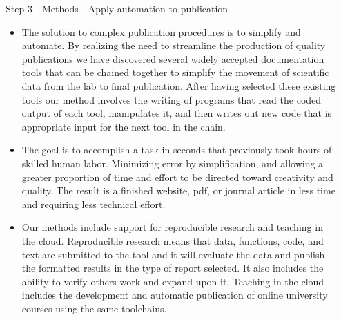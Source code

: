 \documentclass[final]{beamer}
\begin{document}
\begin{frame}[fragile]
\begin{columns}[t]
\begin{column}{0.31\linewidth}
\begin{minipage}[t][.955\textheight]{\linewidth}
\vfill%
\vspace{0ex}
\begin{block}{Step 3 - Methods - Apply automation to publication}
\vspace{0ex}
\begin{itemize}
\item The solution to complex publication procedures is to simplify and automate. By realizing the need to streamline the production of quality publications we have discovered several widely accepted documentation tools that can be chained together to simplify the movement of scientific data from the lab to final publication. After having selected these existing tools our method involves the writing of programs that read the coded output of each tool, manipulates it, and then writes out new code that is appropriate input for the next tool in the chain.
\item The goal is to accomplish a task in seconds that previously took hours of skilled human labor. Minimizing error by simplification, and allowing a greater proportion of time and effort to be directed toward creativity and quality.
The result is a finished website, pdf, or journal article in less time and requiring less technical effort.
\item Our methods include support for reproducible research and teaching in the cloud. Reproducible research means that data, functions, code, and text are submitted to the tool and it will evaluate the data and publish the formatted results in the type of report selected. It also includes the ability to verify others work and expand upon it. Teaching in the cloud includes the development and automatic publication of online university courses using the same toolchains.
\end{itemize}
\vspace{2ex}
\end{block}
\vfill

\end{minipage}
\end{column}%

\begin{column}{0.31\linewidth}
\begin{minipage}[t][.955\textheight]{\linewidth} 


\end{minipage}
\end{column}
\end{columns}
\end{frame}
\end{document}
